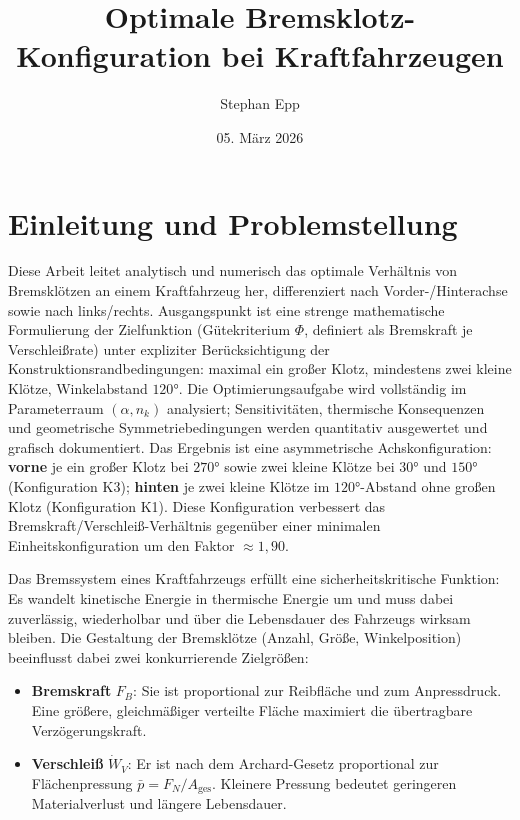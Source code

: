 ﻿\documentclass[12pt,a4paper]{article}
\title{\textbf{Optimale Bremsklotz-Konfiguration bei Kraftfahrzeugen}}
\author{Stephan Epp}
\date{05. März 2026}
\theoremstyle{definition}
\begin{document}
\maketitle

\tableofcontents
\newpage

\section{Einleitung und Problemstellung}
Diese Arbeit leitet analytisch und numerisch das optimale Verhältnis von
Bremsklötzen an einem Kraftfahrzeug her, differenziert nach Vorder-/Hinterachse
sowie nach links/rechts.  Ausgangspunkt ist eine strenge mathematische Formulierung
der Zielfunktion (Gütekriterium $\Phi$, definiert als Bremskraft je
Verschleißrate) unter expliziter Berücksichtigung der Konstruktionsrandbedingungen:
maximal ein großer Klotz, mindestens zwei kleine Klötze, Winkelabstand $120 °$.
Die Optimierungsaufgabe wird vollständig im Parameterraum $(\alpha, n_k)$
analysiert; Sensitivitäten, thermische Konsequenzen und geometrische
Symmetriebedingungen werden quantitativ ausgewertet und grafisch dokumentiert.
Das Ergebnis ist eine asymmetrische Achskonfiguration: \textbf{vorne} je
ein großer Klotz bei $270 °$ sowie zwei kleine Klötze bei $30 °$ und $150 °$
(Konfiguration K3); \textbf{hinten} je zwei kleine Klötze im $120 °$-Abstand
ohne großen Klotz (Konfiguration K1).  Diese Konfiguration verbessert das
Bremskraft/Verschleiß-Verhältnis gegenüber einer minimalen Einheitskonfiguration
um den Faktor $\approx 1{,}90$.

Das Bremssystem eines Kraftfahrzeugs erfüllt eine sicherheitskritische Funktion:
Es wandelt kinetische Energie in thermische Energie um und muss dabei zuverlässig,
wiederholbar und über die Lebensdauer des Fahrzeugs wirksam bleiben.  Die
Gestaltung der Bremsklötze (Anzahl, Größe, Winkelposition) beeinflusst dabei zwei
konkurrierende Zielgrößen:

\begin{itemize}[leftmargin=1.5em, itemsep=2pt]
  \item \textbf{Bremskraft} $F_B$: Sie ist proportional zur Reibfläche und zum
        Anpressdruck. Eine größere, gleichmäßiger verteilte Fläche maximiert
        die übertragbare Verzögerungskraft.
  \item \textbf{Verschleiß} $\dot{W}_V$: Er ist nach dem Archard-Gesetz
        proportional zur Flächenpressung $\bar{p} = F_N / A_{\text{ges}}$.
        Kleinere Pressung bedeutet geringeren Materialverlust und längere
        Lebensdauer.
\end{itemize}
\end{document}
